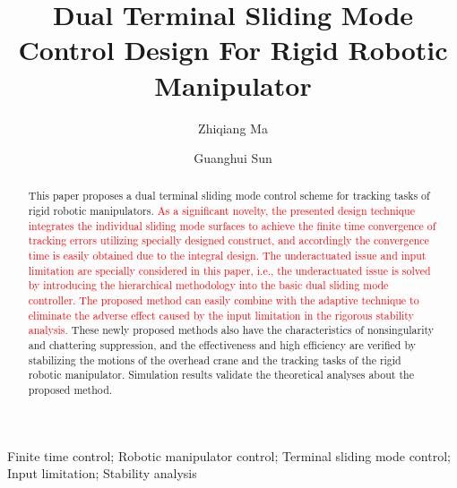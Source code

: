 \documentclass[3p]{elsarticle}
\theoremstyle{plain}
\theoremstyle{remark}
\begin{document}
\begin{frontmatter}
\title{Dual Terminal Sliding Mode Control Design For Rigid Robotic Manipulator}
\author{Zhiqiang Ma}
\author{Guanghui Sun}
\address{Research Institute of Intelligent Control and Systems, Harbin Institute of Technology, Harbin 150001, China}

\begin{abstract}
This paper proposes a dual terminal sliding mode control scheme for tracking tasks of rigid robotic manipulators. \textcolor{red}{As a signiﬁcant novelty, the presented design technique integrates the individual sliding mode  surfaces to achieve the finite time convergence of tracking errors utilizing specially designed construct, and accordingly the convergence time is easily obtained due to the integral design. The underactuated issue and input limitation are specially considered in this paper, i.e., the underactuated issue is solved by introducing the hierarchical methodology into the basic dual sliding mode controller. The proposed method can easily combine with the adaptive technique to  eliminate the adverse effect caused by the input limitation in the rigorous stability analysis.} These newly proposed methods also have the characteristics of nonsingularity and chattering suppression, and the effectiveness and high efficiency are verified by stabilizing the motions of the overhead crane and the tracking tasks of the rigid robotic manipulator. Simulation results validate the theoretical analyses about the proposed method.
\end{abstract}
\begin{keyword}
Finite time control; Robotic manipulator control; Terminal sliding mode control; Input limitation; Stability analysis
\end{keyword}
\end{frontmatter}
\end{document}
